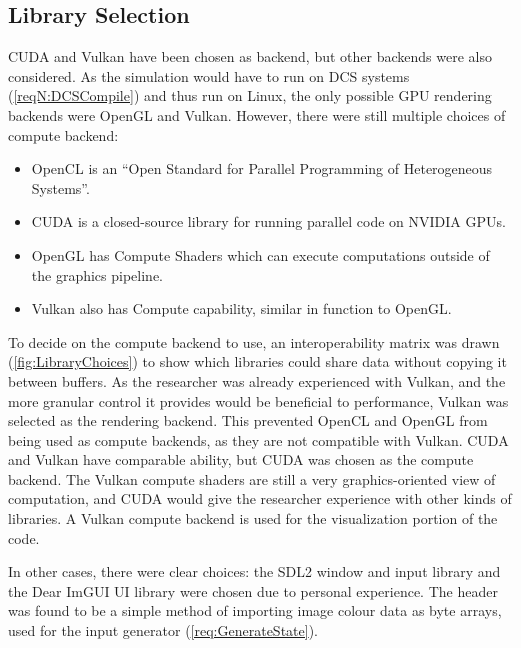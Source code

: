 \subsection{Library Selection}
\label{sec:LibrarySelection}

CUDA and Vulkan have been chosen as backend, but other backends were also considered.
As the simulation would have to run on DCS systems (\cref{reqN:DCSCompile}) and thus run on Linux, the only possible GPU rendering backends were OpenGL and Vulkan.
However, there were still multiple choices of compute backend:
\begin{itemize}
    \item OpenCL\cite{tool:OpenCL1.0PressRelease} is an ``Open Standard for Parallel Programming of Heterogeneous Systems''\cite{TheKhronosGroupOpenCLInc}.
    \item CUDA\cite{tool:CUDA} is a closed-source library for running parallel code on NVIDIA GPUs.
    \item OpenGL has Compute Shaders\cite{tool:OpenGLComputeShaderExt} which can execute computations outside of the graphics pipeline.
    \item Vulkan also has Compute capability\cite{TheKhronosGroupVulkanGuide}, similar in function to OpenGL.
\end{itemize}
To decide on the compute backend to use, an interoperability matrix was drawn (\cref{fig:LibraryChoices}) to show which libraries could share data without copying it between buffers.
As the researcher was already experienced with Vulkan, and the more granular control it provides would be beneficial to performance, Vulkan was selected as the rendering backend.
This prevented OpenCL and OpenGL from being used as compute backends, as they are not compatible with Vulkan.
CUDA and Vulkan have comparable ability, but CUDA was chosen as the compute backend.
The Vulkan compute shaders are still a very graphics-oriented view of computation, and CUDA would give the researcher experience with other kinds of libraries.
A Vulkan compute backend is used for the visualization portion of the code.


In other cases, there were clear choices: the SDL2\cite{SimpleHomepage} window and input library and the Dear ImGUI\cite{CornutDearImGui} UI library were chosen due to personal experience.
The  header was found to be a simple method of importing image colour data as byte arrays, used for the input generator (\cref{req:GenerateState}).

